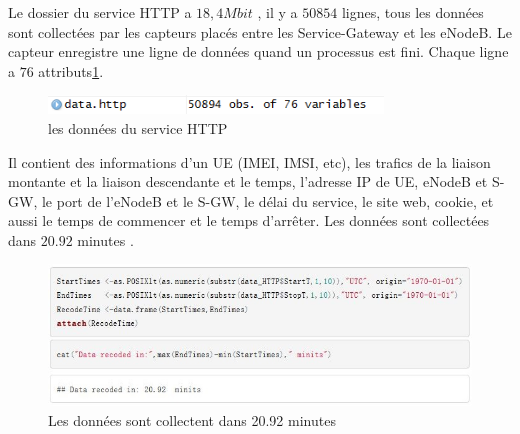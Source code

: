 Le dossier du service HTTP a $18,4Mbit$ , il y a $50854$ lignes, tous les données sont collectées par les capteurs placés entre les Service-Gateway et les eNodeB. Le capteur enregistre une ligne de données quand un processus est fini. Chaque ligne a $76$ attributs\ref{Fig.HTTP}.

      \begin{figure}[H]
          \centering
          \includegraphics[width=3.5in]{images/http.png}
          \caption{les données du service HTTP}
          \label{Fig.HTTP}
      \end{figure}
      
Il contient des informations d'un UE (IMEI, IMSI, etc), les trafics de la liaison montante et la liaison descendante et le temps, l'adresse IP de UE, eNodeB et S-GW, le port de l'eNodeB et le S-GW, le délai du service, le site web, cookie, et aussi le temps de commencer et le temps d'arrêter.
Les données sont collectées dans $20.92$ minutes .

      
      \begin{figure}[H]
\centering
\includegraphics[width=15Cm]{images/lasttime}
\caption{Les données sont collectent dans 20.92 minutes}
\label{fig:lasttime}
\end{figure}

